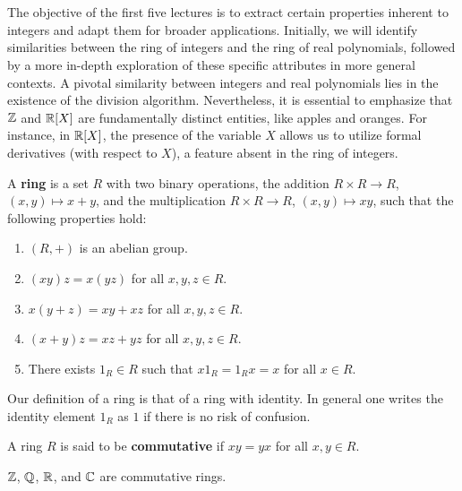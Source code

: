 \chapter{}

The objective of the first five lectures is to extract certain properties inherent to integers and adapt them for broader applications. Initially, we will identify similarities between the ring of integers and the ring of real polynomials, 
followed by a more in-depth exploration of these specific attributes in more general contexts. A pivotal similarity between integers and real polynomials lies in the existence of the division algorithm. Nevertheless, it is essential to emphasize that $\mathbb{Z}$ and $\mathbb{R}[X]$ are fundamentally distinct entities, like apples and oranges. For instance, in $\mathbb{R}[X]$, 
the presence of the variable $X$ allows us to utilize formal derivatives 
(with respect to $X$), a feature absent in the ring of integers. 


\begin{definition}
A \textbf{ring} is a set $R$ with two binary operations, the addition
$R\times R\to R$, $(x,y)\mapsto x+y$, and the multiplication
$R\times R\to R$, $(x,y)\mapsto xy$, such that
the following properties hold:
\begin{enumerate}
    \item $(R,+)$ is an abelian group.
    \item $(xy)z=x(yz)$ for all $x,y,z\in R$.
    \item $x(y+z)=xy+xz$ for all $x,y,z\in R$.
    \item $(x+y)z=xz+yz$ for all $x,y,z\in R$.
    \item There exists $1_R\in R$ such that $x1_R=1_Rx=x$ for all $x\in R$.
\end{enumerate}
\end{definition}

Our definition of a ring is that of a ring with identity. In general one
writes the identity element $1_R$ as $1$ if there is no risk of confusion.

\begin{definition}
A ring $R$ is said to be \textbf{commutative} if $xy=yx$ for all $x,y\in R$. 
\end{definition}

\begin{example}
$\mathbb{Z}$, $\mathbb{Q}$, $\mathbb{R}$, and $\mathbb{C}$ are commutative rings.
\end{example}

